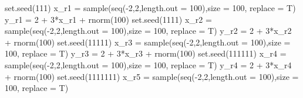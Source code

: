 \documentclass[
  letterpaper,
  DIV=11,
  numbers=noendperiod]{scrreprt}
\newenvironment{Shaded}{\begin{snugshade}}{\end{snugshade}}
\newcommand{\AttributeTok}[1]{\textcolor[rgb]{0.65,0.35,0.00}{#1}}
\newcommand{\DecValTok}[1]{\textcolor[rgb]{0.47,0.16,0.63}{#1}}
\newcommand{\FunctionTok}[1]{\textcolor[rgb]{0.02,0.16,0.49}{#1}}
\newcommand{\NormalTok}[1]{\textcolor[rgb]{0.33,0.33,0.33}{#1}}
\newcommand{\OtherTok}[1]{\textcolor[rgb]{0.85,0.12,0.09}{#1}}
\newcommand{\SpecialCharTok}[1]{\textcolor[rgb]{0.00,0.46,0.62}{#1}}
\begin{document}
\begin{Shaded}
\begin{Highlighting}[]
\FunctionTok{set.seed}\NormalTok{(}\DecValTok{111}\NormalTok{)}
\NormalTok{x\_r1 }\OtherTok{=} \FunctionTok{sample}\NormalTok{(}\FunctionTok{seq}\NormalTok{(}\SpecialCharTok{{-}}\DecValTok{2}\NormalTok{,}\DecValTok{2}\NormalTok{,}\AttributeTok{length.out =} \DecValTok{100}\NormalTok{),}\AttributeTok{size =} \DecValTok{100}\NormalTok{, }\AttributeTok{replace =}\NormalTok{ T)}
\NormalTok{y\_r1 }\OtherTok{=} \DecValTok{2} \SpecialCharTok{+} \DecValTok{3}\SpecialCharTok{*}\NormalTok{x\_r1 }\SpecialCharTok{+} \FunctionTok{rnorm}\NormalTok{(}\DecValTok{100}\NormalTok{)}
\FunctionTok{set.seed}\NormalTok{(}\DecValTok{1111}\NormalTok{)}
\NormalTok{x\_r2 }\OtherTok{=} \FunctionTok{sample}\NormalTok{(}\FunctionTok{seq}\NormalTok{(}\SpecialCharTok{{-}}\DecValTok{2}\NormalTok{,}\DecValTok{2}\NormalTok{,}\AttributeTok{length.out =} \DecValTok{100}\NormalTok{),}\AttributeTok{size =} \DecValTok{100}\NormalTok{, }\AttributeTok{replace =}\NormalTok{ T)}
\NormalTok{y\_r2 }\OtherTok{=} \DecValTok{2} \SpecialCharTok{+} \DecValTok{3}\SpecialCharTok{*}\NormalTok{x\_r2 }\SpecialCharTok{+} \FunctionTok{rnorm}\NormalTok{(}\DecValTok{100}\NormalTok{)}
\FunctionTok{set.seed}\NormalTok{(}\DecValTok{11111}\NormalTok{)}
\NormalTok{x\_r3 }\OtherTok{=} \FunctionTok{sample}\NormalTok{(}\FunctionTok{seq}\NormalTok{(}\SpecialCharTok{{-}}\DecValTok{2}\NormalTok{,}\DecValTok{2}\NormalTok{,}\AttributeTok{length.out =} \DecValTok{100}\NormalTok{),}\AttributeTok{size =} \DecValTok{100}\NormalTok{, }\AttributeTok{replace =}\NormalTok{ T)}
\NormalTok{y\_r3 }\OtherTok{=} \DecValTok{2} \SpecialCharTok{+} \DecValTok{3}\SpecialCharTok{*}\NormalTok{x\_r3 }\SpecialCharTok{+} \FunctionTok{rnorm}\NormalTok{(}\DecValTok{100}\NormalTok{)}
\FunctionTok{set.seed}\NormalTok{(}\DecValTok{111111}\NormalTok{)}
\NormalTok{x\_r4 }\OtherTok{=} \FunctionTok{sample}\NormalTok{(}\FunctionTok{seq}\NormalTok{(}\SpecialCharTok{{-}}\DecValTok{2}\NormalTok{,}\DecValTok{2}\NormalTok{,}\AttributeTok{length.out =} \DecValTok{100}\NormalTok{),}\AttributeTok{size =} \DecValTok{100}\NormalTok{, }\AttributeTok{replace =}\NormalTok{ T)}
\NormalTok{y\_r4 }\OtherTok{=} \DecValTok{2} \SpecialCharTok{+} \DecValTok{3}\SpecialCharTok{*}\NormalTok{x\_r4 }\SpecialCharTok{+} \FunctionTok{rnorm}\NormalTok{(}\DecValTok{100}\NormalTok{)}
\FunctionTok{set.seed}\NormalTok{(}\DecValTok{1111111}\NormalTok{)}
\NormalTok{x\_r5 }\OtherTok{=} \FunctionTok{sample}\NormalTok{(}\FunctionTok{seq}\NormalTok{(}\SpecialCharTok{{-}}\DecValTok{2}\NormalTok{,}\DecValTok{2}\NormalTok{,}\AttributeTok{length.out =} \DecValTok{100}\NormalTok{),}\AttributeTok{size =} \DecValTok{100}\NormalTok{, }\AttributeTok{replace =}\NormalTok{ T)}

\end{Highlighting}
\end{Shaded}
\end{document}
